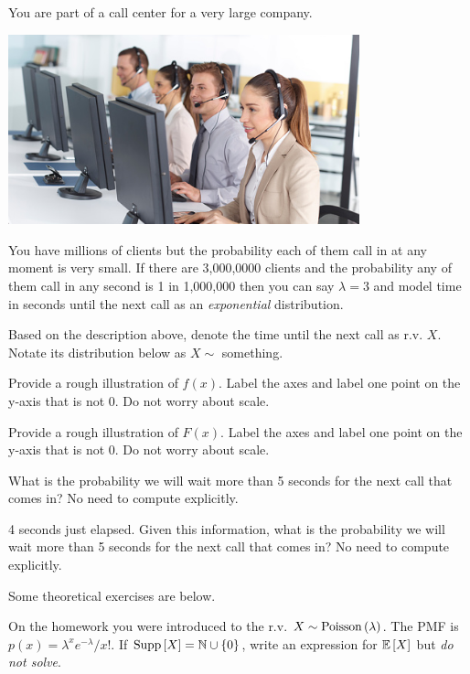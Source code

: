 \documentclass[12pt]{article}
\begin{document}
\eenum


\problem You are part of a call center for a very large company.

\begin{center}
\includegraphics[width=4in]{call.png}
\end{center}

\noindent You have millions of clients but the probability each of them call in at any moment is very small. If there are 3,000,0000 clients and the probability any of them call in any second is 1 in 1,000,000 then you can say $\lambda = 3$ and model time in seconds until the next call as an \emph{exponential} distribution.

\benum
{} Based on the description above, denote the time until the next call as r.v. $X$. Notate its distribution below as $X \sim$ something.

 Provide a rough illustration of $f(x)$. Label the axes and label one point on the y-axis that is not 0. Do not worry about scale. 

 Provide a rough illustration of $F(x)$. Label the axes and label one point on the y-axis that is not 0. Do not worry about scale.  


 What is the probability we will wait more than 5 seconds for the next call that comes in? No need to compute explicitly. 

 4 seconds just elapsed. Given this information, what is the probability we will wait more than 5 seconds for the next call that comes in? No need to compute explicitly. 

\eenum



\problem Some theoretical exercises are below.


\benum
{} On the homework you were introduced to the r.v. $X \sim \mathrm{Poisson}\left(\lambda\right)$. The PMF is $p(x) = \lambda^x e^{-\lambda} / x!$. If $\text{Supp}\left[X\right] = \mathbb{N} \cup \left\{0\right\}$, write an expression for $\mathbb{E}\left[X\right]$ but \textit{do not solve}.
\end{document}
